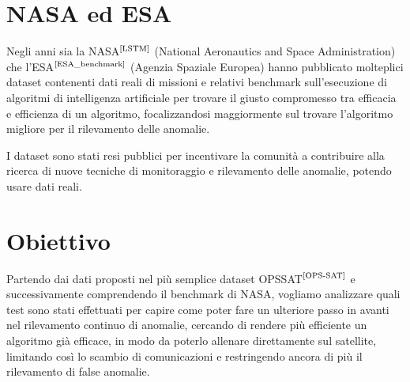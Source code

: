 \section{NASA ed ESA}
Negli anni sia la NASA$^{\text{\cite{LSTM}}}$ (National Aeronautics and Space Administration) che l'ESA$^{\text{\cite{ESA_benchmark}}}$ (Agenzia Spaziale Europea) hanno pubblicato molteplici dataset contenenti dati reali di missioni e relativi benchmark sull'esecuzione di algoritmi di intelligenza artificiale per trovare il giusto compromesso tra efficacia e efficienza di un algoritmo, focalizzandosi maggiormente sul trovare l'algoritmo migliore per il rilevamento delle anomalie.

I dataset sono stati resi pubblici per incentivare la comunità a contribuire alla ricerca di nuove tecniche di monitoraggio e rilevamento delle anomalie, potendo usare dati reali.

\section{Obiettivo}
Partendo dai dati proposti nel più semplice dataset OPS\textunderscore SAT$^{\text{\cite{OPS-SAT}}}$ e successivamente comprendendo il benchmark di NASA, vogliamo analizzare quali test sono stati effettuati per capire come poter fare un ulteriore passo in avanti nel rilevamento continuo di anomalie, cercando di rendere più efficiente un algoritmo già efficace, in modo da poterlo allenare direttamente sul satellite, limitando così lo scambio di comunicazioni e restringendo ancora di più il rilevamento di false anomalie.

